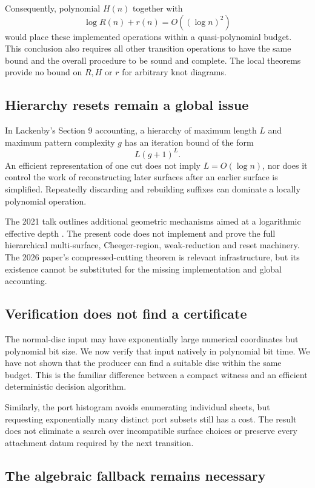 \documentclass[11pt,a4paper]{article}
\theoremstyle{definition}\newtheorem{definition}[theorem]{Definition}
\theoremstyle{remark}\newtheorem{remark}[theorem]{Remark}
\begin{document}
Consequently, polynomial $H(n)$ together with
\[
 \log R(n)+r(n)=O((\log n)^2)
\]
would place these implemented operations within a quasi-polynomial budget.
This conclusion also requires all other transition operations to have the
same bound and the overall procedure to be sound and complete. The local
theorems provide no bound on $R,H$ or $r$ for arbitrary knot diagrams.

\subsection{Hierarchy resets remain a global issue}

In Lackenby's Section 9 accounting, a hierarchy of maximum length $L$
and maximum pattern complexity $g$ has an iteration bound of the form
\[
 L(g+1)^L.
\]
An efficient representation of one cut does not imply $L=O(\log n)$,
nor does it control the work of reconstructing later surfaces after an
earlier surface is simplified. Repeatedly discarding and rebuilding
suffixes can dominate a locally polynomial operation.

The 2021 talk outlines additional geometric mechanisms aimed at a
logarithmic effective depth \cite{slides}. The present code does not
implement and prove the full hierarchical multi-surface, Cheeger-region,
weak-reduction and reset machinery. The 2026 paper's compressed-cutting
theorem is relevant infrastructure, but its existence cannot be substituted
for the missing implementation and global accounting.

\subsection{Verification does not find a certificate}

The normal-disc input may have exponentially large numerical coordinates
but polynomial bit size. We now verify that input natively in polynomial
bit time. We have not shown that the producer can find a suitable disc
within the same budget. This is the familiar difference between a compact
witness and an efficient deterministic decision algorithm.

Similarly, the port histogram avoids enumerating individual sheets, but
requesting exponentially many distinct port subsets still has a cost.
The result does not eliminate a search over incompatible surface choices
or preserve every attachment datum required by the next transition.

\subsection{The algebraic fallback remains necessary}
\end{document}
